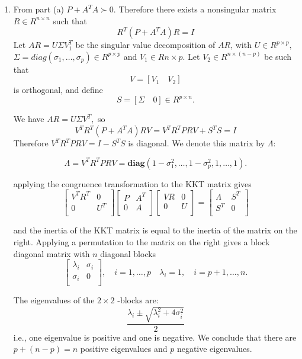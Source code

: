 \documentclass{article}
\begin{document}
\begin{enumerate}[label=\alph*)]
\begin{itemize}
\end{itemize}
	
\item From part (a) $P + A^TA \succ 0.$ Therefore there exists a nonsingular matrix $R \in R^{n \times n}$ such that
$$
R^T(P + A^TA)R = I
$$
Let $AR = U \Sigma V_1^T$ be the singular value decomposition of $AR$, with $U \in R^{p \times p},$
$\Sigma = diag(\sigma_1, \dots, \sigma_p) \in R^{p \times p}$ and $V_1 \in R{n \times p}.$ Let $V_2 \in R^{n \times (n - p)}$ be such that 
$$
V = [V_1 \quad V_2] 
$$
is orthogonal, and define
$$
S = [\Sigma \quad 0] \in R^{p \times n}.
$$

We have $AR = U \Sigma V^T,$ so
$$
V^TR^T(P + A^TA)RV = V^TR^TPRV + S^TS = I
$$
Therefore $V^TR^TPRV = I - S^TS$ is diagonal. We denote this matrix by $\Lambda:$

$$
\Lambda = V^TR^TPRV = 
\mathbf{diag}(1 - \sigma_1^2, \dots, 1 - \sigma_p^2, 1, \dots, 1).
$$

applying the congruence transformation to the KKT matrix gives 
$$
\begin{bmatrix} 
	V^TR^T & 0 \\
	0 & U^T\\
\end{bmatrix}
\begin{bmatrix} 
	P & A^T \\
	0 & A\\
\end{bmatrix}
\begin{bmatrix} 
	VR & 0 \\
	0 & U\\
\end{bmatrix} = 
\begin{bmatrix} 
	\Lambda & S^T \\
	S^T & 0\\
\end{bmatrix}
$$

and the inertia of the KKT matrix is equal to the inertia of the matrix on the right.
Applying a permutation to the matrix on the right gives a block diagonal matrix with $n$ diagonal blocks
$$
\begin{bmatrix} 
	\lambda_i & \sigma_i \\
	\sigma_i & 0\\
\end{bmatrix}, \quad i = 1, \dots, p
\quad \lambda_i = 1, \quad i = p + 1, \dots, n.
$$

The eigenvalues of the $2 \times 2$ -blocks are:
$$
\frac{\lambda_i \pm \sqrt{\lambda _i ^2 + 4 \sigma _i ^2}}{2}
$$
i.e., one eigenvalue is positive and one is negative. We conclude that there are 
$p + (n - p) = n$ 
positive eigenvalues and 
$p$ negative eigenvalues.

\end{enumerate}
\end{document}

